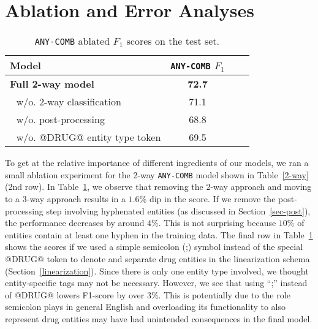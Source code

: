 \documentclass[conference]{IEEEtran}
\begin{document}
\section{Ablation and Error Analyses}
\label{sec-error}
\begin{table}[h]
\centering
 \renewcommand{\arraystretch}{1.2}
 \caption{\texttt{ANY-COMB} ablated $F_1$ scores on the test set.}
\label{tb:ablation}
\begin{tabular}{lccc}
\toprule
\textbf{Model} & \texttt{ANY-COMB} $F_1$ \\\midrule
\textbf{Full 2-way model}  & \textbf{72.7} \\
 \,\, w/o. 2-way classification   & 71.1 \\
 \,\, w/o. post-processing & 68.8 \\
  \,\, w/o. @DRUG@ entity type token & 69.5 \\
\bottomrule
\end{tabular}


\end{table}
To get at the relative importance of different ingredients of our models, we ran a small ablation experiment for the 2-way \texttt{ANY-COMB} model shown in Table~\ref{2-way} (2nd row). 
In Table~\ref{tb:ablation}, we observe that removing the 2-way approach and moving to a 3-way approach results in a $1.6\%$ dip in the score. If we remove the post-processing step involving hyphenated entities (as discussed in Section~\ref{sec-post}), the performance decreases by around $4\%$. This is not surprising because $10\%$ of entities contain at least one hyphen in the training data. The final row in Table~\ref{tb:ablation} shows the scores if we used a simple semicolon (;) symbol instead of the special @DRUG@ token to denote and separate drug entities in the linearization schema (Section~\ref{linearization}). Since there is only one entity type involved, we thought entity-specific tags may not be necessary. However, we see that using ``;'' instead of @DRUG@ lowers F1-score by over $3\%$. This is potentially due to the role semicolon plays in general English and overloading its functionality to also represent drug entities may have had unintended consequences in the final model.
\end{document}
